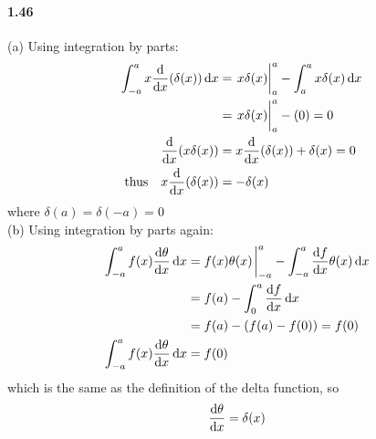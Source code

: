 \documentclass[../main.tex]{subfiles}
\begin{document}
\paragraph{1.46}
(a) Using integration by parts:
\begin{align*}
    \int_{-a}^{a} x \dv{x} (\delta(x)) \dd{x} &= \eval{x \delta(x)}_a^a
        - \int_a^a x \delta(x) \dd{x} \\
    &= \eval{x \delta(x)}_a^a  - (0) = 0 \\
    \dv{x} (x\delta(x)) &= x \dv{x} (\delta(x)) + \delta(x) = 0 \\
    \qq{thus} x \dv{x} (\delta(x)) &= -\delta(x)
\end{align*}
where $\delta(a) = \delta(-a) = 0$ \\
(b) Using integration by parts again:
\begin{align*}
    \int_{-a}^a f(x) \dv{\theta}{x} \dd{x} &= f(x)\theta(x) \eval_{-a}^a
        - \int_{-a}^a \dv{f}{x} \theta(x) \dd{x} \\
    &= f(a) - \int_0^a \dv{f}{x} \dd{x} \\
    &= f(a) - (f(a) - f(0)) = f(0) \\
    \int_{-a}^a f(x) \dv{\theta}{x} \dd{x} &= f(0)
\end{align*}
which is the same as the definition of the delta function, so
\begin{align*}
    \dv{\theta}{x} = \delta(x)
\end{align*}
\end{document}
